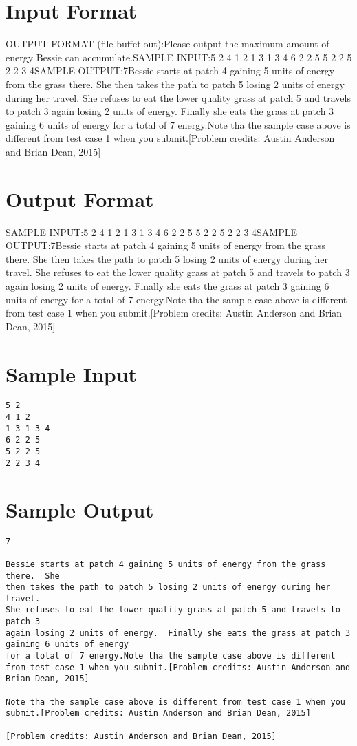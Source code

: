 \documentclass[12pt]{article}
\begin{document}
\section*{Input Format}
OUTPUT FORMAT (file buffet.out):Please output the maximum amount of energy Bessie can accumulate.SAMPLE INPUT:5 2
4 1 2
1 3 1 3 4
6 2 2 5
5 2 2 5
2 2 3 4SAMPLE OUTPUT:7Bessie starts at patch 4 gaining 5 units of energy from the grass there.  She
then takes the path to patch 5 losing 2 units of energy during her travel.
She refuses to eat the lower quality grass at patch 5 and travels to patch 3
again losing 2 units of energy.  Finally she eats the grass at patch 3 gaining 6 units of energy
for a total of 7 energy.Note tha the sample case above is different from test case 1 when you submit.[Problem credits: Austin Anderson and Brian Dean, 2015]

\section*{Output Format}
SAMPLE INPUT:5 2
4 1 2
1 3 1 3 4
6 2 2 5
5 2 2 5
2 2 3 4SAMPLE OUTPUT:7Bessie starts at patch 4 gaining 5 units of energy from the grass there.  She
then takes the path to patch 5 losing 2 units of energy during her travel.
She refuses to eat the lower quality grass at patch 5 and travels to patch 3
again losing 2 units of energy.  Finally she eats the grass at patch 3 gaining 6 units of energy
for a total of 7 energy.Note tha the sample case above is different from test case 1 when you submit.[Problem credits: Austin Anderson and Brian Dean, 2015]

\section*{Sample Input}
\begin{verbatim}
5 2
4 1 2
1 3 1 3 4
6 2 2 5
5 2 2 5
2 2 3 4
\end{verbatim}

\section*{Sample Output}
\begin{verbatim}
7

Bessie starts at patch 4 gaining 5 units of energy from the grass there.  She
then takes the path to patch 5 losing 2 units of energy during her travel.
She refuses to eat the lower quality grass at patch 5 and travels to patch 3
again losing 2 units of energy.  Finally she eats the grass at patch 3 gaining 6 units of energy
for a total of 7 energy.Note tha the sample case above is different from test case 1 when you submit.[Problem credits: Austin Anderson and Brian Dean, 2015]

Note tha the sample case above is different from test case 1 when you submit.[Problem credits: Austin Anderson and Brian Dean, 2015]

[Problem credits: Austin Anderson and Brian Dean, 2015]
\end{verbatim}
\end{document}
